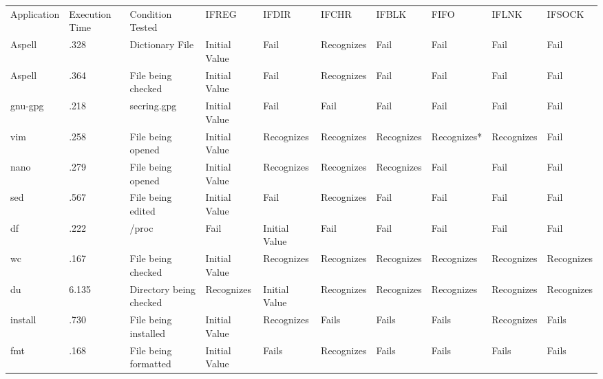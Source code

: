 \begin{table*}[t]
    \scriptsize{}
    \begin{tabular}{l  l  l  |  l  l  l  l  l  l  l}
    \toprule{}
        Application &  Execution Time & Condition Tested           & IFREG        & IFDIR        & IFCHR     & IFBLK    & FIFO      & IFLNK    & IFSOCK\\
        Aspell      & .328            & Dictionary File            & Initial Value  & Fail           & Recognizes  & Fail       & Fail        & Fail       & Fail\\
        Aspell      & .364            & File being checked         & Initial Value  & Fail           & Recognizes  & Fail       & Fail        & Fail       & Fail\\
        gnu-gpg     & .218            & secring.gpg                & Initial Value  & Fail           & Fail        & Fail       & Fail        & Fail       & Fail\\
        vim         & .258            & File being opened          & Initial Value  & Recognizes     & Recognizes  & Recognizes & Recognizes* & Recognizes & Fail\\
        nano        & .279            & File being opened          & Initial Value  & Recognizes     & Recognizes  & Recognizes & Fail        & Fail       & Fail\\
        sed         & .567            & File being edited          & Initial Value  & Fail           & Recognizes  & Fail       & Fail        & Fail       & Fail\\
        df          & .222            & /proc                      & Fail           & Initial Value  & Fail        & Fail       & Fail        & Fail       & Fail\\
        wc          & .167            & File being checked         & Initial Value  & Recognizes     & Recognizes  & Recognizes & Recognizes  & Recognizes & Recognizes\\
        du          & 6.135           & Directory being checked    & Recognizes     & Initial Value  & Recognizes  & Recognizes & Recognizes  & Recognizes & Recognizes\\
        install     & .730            & File being installed       & Initial Value  & Recognizes     & Fails       & Fails      & Fails       & Recognizes & Fails\\
        fmt         & .168            & File being formatted       & Initial Value  & Fails          & Recognizes  & Fails      & Fails       & Fails      & Fails\\

\end{tabular}
\end{table*}
